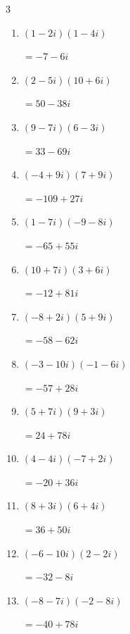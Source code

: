 \begin{multicols}{3}
\begin{enumerate}
        $\displaystyle =-26+87i$

  \item $\displaystyle (1-2i)(1-4i)$

        $\displaystyle =-7-6i$

  \item $\displaystyle (2-5i)(10+6i)$

        $\displaystyle =50-38i$

  \item $\displaystyle (9-7i)(6-3i)$

        $\displaystyle =33-69i$

  \item $\displaystyle (-4+9i)(7+9i)$

        $\displaystyle =-109+27i$

  \item $\displaystyle (1-7i)(-9-8i)$

        $\displaystyle =-65+55i$

  \item $\displaystyle (10+7i)(3+6i)$

        $\displaystyle =-12+81i$

  \item $\displaystyle (-8+2i)(5+9i)$

        $\displaystyle =-58-62i$

  \item $\displaystyle (-3-10i)(-1-6i)$

        $\displaystyle =-57+28i$

\columnbreak %

  \item $\displaystyle (5+7i)(9+3i)$

        $\displaystyle =24+78i$

  \item $\displaystyle (4-4i)(-7+2i)$

        $\displaystyle =-20+36i$

  \item $\displaystyle (8+3i)(6+4i)$

        $\displaystyle =36+50i$

  \item $\displaystyle (-6-10i)(2-2i)$

        $\displaystyle =-32-8i$

  \item $\displaystyle (-8-7i)(-2-8i)$

        $\displaystyle =-40+78i$


\end{enumerate}
\end{multicols}

